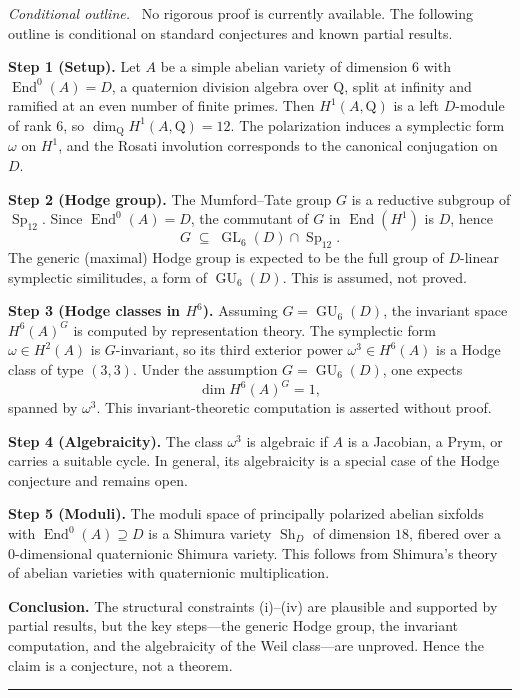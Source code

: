 \documentclass{article}
\DeclareMathOperator{\Sh}{Sh}
\DeclareMathOperator{\Sp}{Sp}
\DeclareMathOperator{\GL}{GL}
\DeclareMathOperator{\GU}{GU}
\DeclareMathOperator{\End}{End}
\newcommand{\mathbb}[1]{\mathrm{#1}}
\newenvironment{proof}[1][Proof]{\par\noindent\textit{#1.}\ }{\hfill\rule{1.2ex}{1.2ex}\par}
\begin{document}
\begin{proof}[Conditional outline]
No rigorous proof is currently available. The following outline is conditional on standard conjectures and known partial results.

\medskip
\noindent\textbf{Step 1 (Setup).}
Let $A$ be a simple abelian variety of dimension $6$ with $\End^0(A)=D$, a quaternion division algebra over $\mathbb{Q}$, split at infinity and ramified at an even number of finite primes. Then $H^1(A,\mathbb{Q})$ is a left $D$-module of rank $6$, so $\dim_{\mathbb{Q}} H^1(A,\mathbb{Q})=12$. The polarization induces a symplectic form $\omega$ on $H^1$, and the Rosati involution corresponds to the canonical conjugation on $D$.

\medskip
\noindent\textbf{Step 2 (Hodge group).}
The Mumford--Tate group $G$ is a reductive subgroup of $\Sp_{12}$. Since $\End^0(A)=D$, the commutant of $G$ in $\End(H^1)$ is $D$, hence
\[
G \;\subseteq\; \GL_6(D)\cap \Sp_{12}.
\]
The generic (maximal) Hodge group is expected to be the full group of $D$-linear symplectic similitudes, a form of $\GU_6(D)$. This is assumed, not proved.

\medskip
\noindent\textbf{Step 3 (Hodge classes in $H^6$).}
Assuming $G=\GU_6(D)$, the invariant space $H^6(A)^G$ is computed by representation theory. The symplectic form $\omega\in H^2(A)$ is $G$-invariant, so its third exterior power $\omega^3\in H^6(A)$ is a Hodge class of type $(3,3)$. Under the assumption $G=\GU_6(D)$, one expects
\[
\dim H^6(A)^G = 1,
\]
spanned by $\omega^3$. This invariant-theoretic computation is asserted without proof.

\medskip
\noindent\textbf{Step 4 (Algebraicity).}
The class $\omega^3$ is algebraic if $A$ is a Jacobian, a Prym, or carries a suitable cycle. In general, its algebraicity is a special case of the Hodge conjecture and remains open.

\medskip
\noindent\textbf{Step 5 (Moduli).}
The moduli space of principally polarized abelian sixfolds with $\End^0(A)\supseteq D$ is a Shimura variety $\Sh_D$ of dimension $18$, fibered over a $0$-dimensional quaternionic Shimura variety. This follows from Shimura's theory of abelian varieties with quaternionic multiplication.

\medskip
\noindent\textbf{Conclusion.}
The structural constraints (i)--(iv) are plausible and supported by partial results, but the key steps---the generic Hodge group, the invariant computation, and the algebraicity of the Weil class---are unproved. Hence the claim is a conjecture, not a theorem.
\end{proof}
\end{document}
